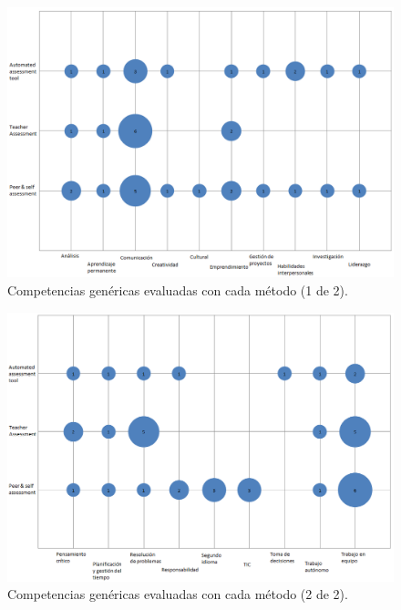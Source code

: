 \pagestyle{empty}
\begin{landscape}
\begin{figure}[H]
  \begin{center}
    \includegraphics[scale=0.6]{BurbujaCompetencias1.png}
  \end{center}
  \caption{Competencias genéricas evaluadas con cada método (1 de 2).}
  \label{fig:competencias1}
\end{figure}

\begin{figure}[H]
  \begin{center}
    \includegraphics[scale=0.6]{BurbujaCompetencias2.png}
  \end{center}
  \caption{Competencias genéricas evaluadas con cada método (2 de 2).}
  \label{fig:competencias2}
\end{figure}

\end{landscape}
\pagestyle{fancy}

